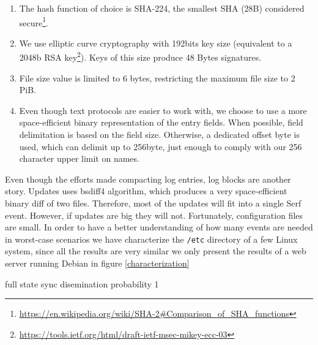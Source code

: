\documentclass{sig-alternate}
\begin{document}
\begin{enumerate}
\item The hash function of choice is SHA-224, the smallest SHA (28B) considered secure\footnote{\url{https://en.wikipedia.org/wiki/SHA-2\#Comparison\_of\_SHA\_functions}}.
\item We use elliptic curve cryptography with 192bits key size (equivalent to a 2048b RSA key\footnote{\url{https://tools.ietf.org/html/draft-ietf-msec-mikey-ecc-03}}). Keys of this size produce  48 Bytes signatures.
\item File size value is limited to 6 bytes, restricting the maximum file size to 2 PiB.
\item Even though text protocols are easier to work with, we choose to use a more space-efficient binary representation of the entry fields. When possible, field delimitation is based on the field size. Otherwise, a dedicated offset byte is used, which can delimit up to 256byte, just enough to comply with our 256 character upper limit on names.
\end{enumerate}

Even though the efforts made compacting log entries, log blocks are another story. Updates uses bsdiff4 algorithm, which produces a very space-efficient binary diff of two files. Therefore, most of the updates will fit into a single Serf event. However, if updates are big they will not. Fortunately, configuration files are small. In order to have a better understanding of how many events are needed in worst-case scenarios we have characterize the \texttt{/etc} directory of a few Linux system, since all the results are very similar we only present the results of a web server running Debian in figure \ref{characterization}

full state sync disemination probability 1
\end{document}
